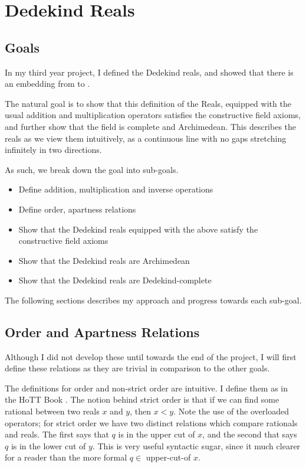 \documentclass[ProjectReport]{subfiles}
\begin{document}
\section{Dedekind Reals}
\subsection{Goals}

In my third year project, I defined the Dedekind reals, and showed that there is an embedding from  to . 



The natural goal is to show that this definition of the Reals, equipped with the usual addition and multiplication operators satisfies the constructive field axioms, and further show that the field is complete and Archimedean. This describes the reals as we view them intuitively, as a continuous line with no gaps stretching infinitely in two directions.

As such, we break down the goal into sub-goals. 

\begin{itemize}
    \item Define addition, multiplication and inverse operations
    \item Define order, apartness relations
    \item Show that the Dedekind reals equipped with the above satisfy the constructive field axioms
    \item Show that the Dedekind reals are Archimedean
    \item Show that the Dedekind reals are Dedekind-complete
\end{itemize}

The following sections describes my approach and progress towards each sub-goal.

\subsection{Order and Apartness Relations}

Although I did not develop these until towards the end of the project, I will first define these relations as they are trivial in comparison to the other goals. 

\RealsOrder 

The definitions for order and non-strict order are intuitive. I define them as in the HoTT Book \cite[Section 11.2.1]{hottbook}. The notion behind strict order is that if we can find some rational between two reals $x$ and $y$, then $x < y$. Note the use of the overloaded operators; for strict order we have two distinct relations which compare rationals and reals. The first says that $q$ is in the upper cut of $x$, and the second that says $q$ is in the lower cut of $y$. This is very useful syntactic sugar, since it much clearer for a reader than the more formal $q \in$ upper-cut-of $x$.
\end{document}
